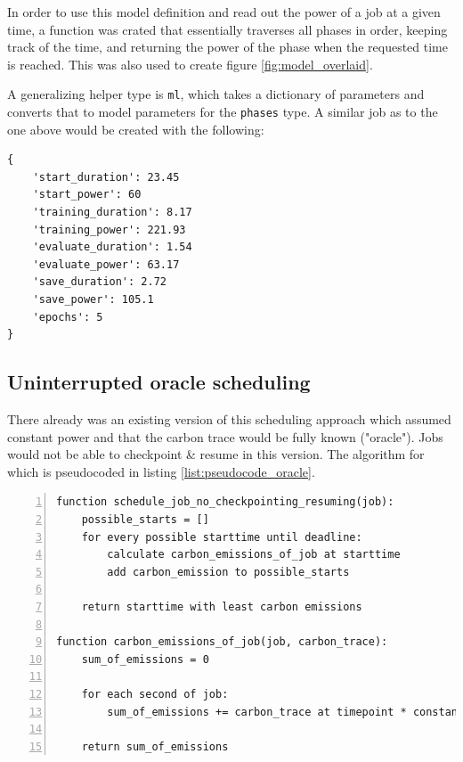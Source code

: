 In order to use this model definition and read out the power of a job at a given time, a function was crated that essentially traverses all phases in order, keeping track of the time, and returning the power of the phase when the requested time is reached. 
This was also used to create figure \ref{fig:model_overlaid}.

A generalizing helper type is \verb|ml|, which takes a dictionary of parameters and converts that to model parameters for the \verb|phases| type. A similar job as to the one above would be created with the following:

\begin{lstlisting}[frame=single, numbers=none, caption={Generic model definition for machine learning jobs}, label={list:roberta_model_definition_generic}, basicstyle=\ttfamily]
{
    'start_duration': 23.45
    'start_power': 60
    'training_duration': 8.17
    'training_power': 221.93
    'evaluate_duration': 1.54
    'evaluate_power': 63.17
    'save_duration': 2.72
    'save_power': 105.1
    'epochs': 5
}
\end{lstlisting}

\subsection{Uninterrupted oracle scheduling} \label{sec:uninterrupted_oracle_scheduling}

There already was an existing version of this scheduling approach which assumed constant power and that the carbon trace would be fully known ("oracle"). 
Jobs would not be able to checkpoint \& resume in this version.
The algorithm for which is pseudocoded in listing \ref{list:pseudocode_oracle}.

\begin{lstlisting}[frame=single, numbers=left, caption={Pseudocode for the original non-interrupt oracle scheduler}, label={list:pseudocode_oracle}, basicstyle=\ttfamily]
function schedule_job_no_checkpointing_resuming(job):
    possible_starts = []
    for every possible starttime until deadline:
        calculate carbon_emissions_of_job at starttime
        add carbon_emission to possible_starts
    
    return starttime with least carbon emissions

function carbon_emissions_of_job(job, carbon_trace):
    sum_of_emissions = 0

    for each second of job:
        sum_of_emissions += carbon_trace at timepoint * constant_watt
    
    return sum_of_emissions
\end{lstlisting}

